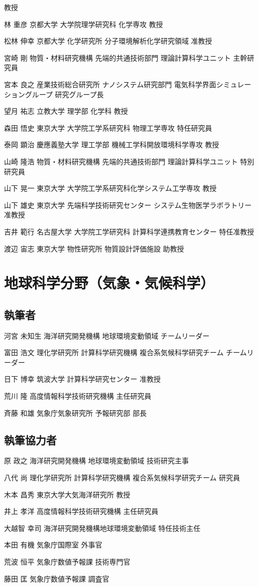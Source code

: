\begin{執筆者一覧}
{教授}
\item
{林 重彦}
{京都大学 大学院理学研究科 化学専攻}
{教授}
\item
{松林 伸幸}
{京都大学 化学研究所 分子環境解析化学研究領域}
{准教授}
\item
{宮崎 剛}
{物質・材料研究機構 先端的共通技術部門 理論計算科学ユニット}
{主幹研究員}
\item
{宮本 良之}
{産業技術総合研究所 ナノシステム研究部門 電気科学界面シミュレーショングループ}
{研究グループ長}
\item
{望月 祐志}
{立教大学 理学部 化学科}
{教授}
\item
{森田 悟史}
{東京大学 大学院工学系研究科 物理工学専攻}
{特任研究員}
\item
{泰岡 顕治}
{慶應義塾大学 理工学部 機械工学科開放環境科学専攻}
{教授}
\item
{山崎 隆浩}
{物質・材料研究機構 先端的共通技術部門 理論計算科学ユニット}
{特別研究員}
\item
{山下 晃一}
{東京大学 大学院工学系研究科化学システム工学専攻}
{教授}
\item
{山下 雄史}
{東京大学 先端科学技術研究センター システム生物医学ラボラトリー}
{准教授}
\item
{吉井 範行}
{名古屋大学 大学院工学研究科 計算科学連携教育センター}
{特任准教授}
\item
{渡辺 宙志}
{東京大学 物性研究所 物質設計評価施設}
{助教授}
\section{地球科学分野（気象・気候科学）}
\subsection{執筆者}
\item
{河宮 未知生}
{海洋研究開発機構 地球環境変動領域}
{チームリーダー}
\item
{富田 浩文}
{理化学研究所 計算科学研究機構 複合系気候科学研究チーム}
{チームリーダー}
\item
{日下 博幸}
{筑波大学 計算科学研究センター}
{准教授}
\item
{荒川 隆}
{高度情報科学技術研究機構}
{主任研究員}
\item
{斉藤 和雄}
{気象庁気象研究所 予報研究部}
{部長}
\subsection{執筆協力者}
\item
{原 政之}
{海洋研究開発機構 地球環境変動領域}
{技術研究主事}
\item
{八代 尚}
{理化学研究所 計算科学研究機構 複合系気候科学研究チーム}
{研究員}
\item
{木本 昌秀}
{東京大学大気海洋研究所}
{教授}
\item
{井上 孝洋}
{高度情報科学技術研究機構}
{主任研究員}
\item
{大越智 幸司}
{海洋研究開発機構地球環境変動領域}
{特任技術主任}
\item
{本田 有機}
{気象庁国際室}
{外事官}
\item
{荒波 恒平}
{気象庁数値予報課}
{技術専門官}
\item
{藤田 匡}
{気象庁数値予報課}
{調査官}

\end{執筆者一覧}
